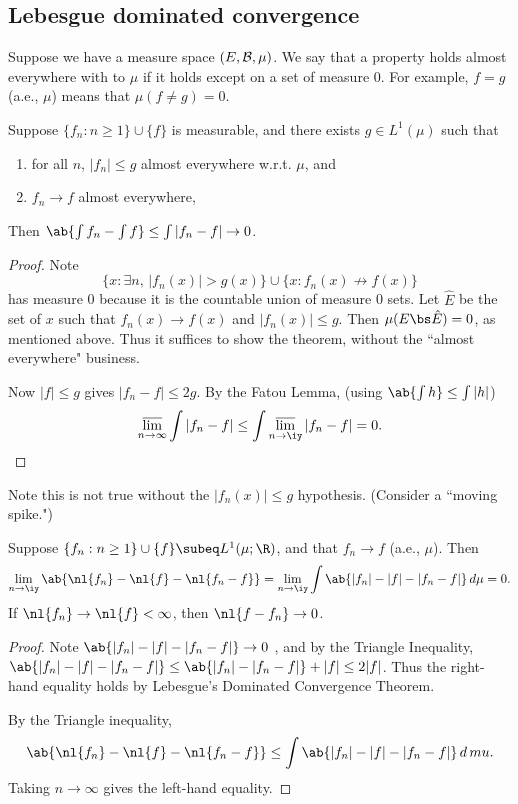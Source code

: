 
\subsection{Lebesgue dominated convergence}
Suppose we have a measure space $(E,\cal B, \mu)$. We say that a property holds almost everywhere with to $\mu$ if it holds except on a set of measure 0. %
For example, $f=g$ (a.e., $\mu$) means that $\mu(f\neq g)=0$.

\begin{thm}
Suppose $\{f_n:n\ge 1\}\cup \{f\}$ is measurable, and there exists $g\in L^1(\mu)$ such that 
\begin{enumerate}
\item
for all $n$, $|f_n|\le g$ almost everywhere w.r.t. $\mu$, and %
\item
$f_n\to f$ almost everywhere,
\end{enumerate}
Then $\ab{\int f_n-\int f}\le \int |f_n-f|\to 0$.
\end{thm}
\begin{proof}
Note
\[
\{x:\exists n,\, |f_n(x)|>g(x)\}\cup \{x:f_n(x)\not\to f(x)\}
\]
has measure 0 because it is the countable union of measure 0 sets.
Let $\hat E$ be the set of $x$ such that $f_n(x)\to f(x)$ and $|f_n(x)|\le g$. Then $\mu(E\bs \hat E)=0$, as mentioned above.
Thus it suffices to show the theorem, without the ``almost everywhere" business.

Now $|f|\le g$ gives $|f_n-f|\le 2g$. By the Fatou Lemma, (using $\ab{\int h}\leq \int | h|$)
\[
\varlimsup_{n\to \infty} \int |f_n-f|\le \int \varlimsup_{n\to \iy} |f_n-f|=0.
\]
\end{proof}
Note this is not true without the $|f_n(x)|\le g$ hypothesis. (Consider a ``moving spike.")

\begin{thm}\label{lieb}
Suppose $\{f_n:n\ge 1\}\cup \{f\}\subeq L^1(\mu;\R)$, and that $f_n\to f$ (a.e., $\mu$). Then
\[
\lim_{n\to \iy} \ab{
\nl{f_n}-\nl{f}-\nl{f_n-f}
}
=
\lim_{n\to \iy}\int \ab{
|f_n|-|f|-|f_n-f|
}\,d\mu=0.
\]
If $\nl{f_n}\to \nl{f}<\infty$, then $\nl{f-f_n}\to 0$.
\end{thm}
\begin{proof}
Note $\ab{|f_n|-|f|-|f_n-f|}\to 0$ \am{}, and by the Triangle Inequality,
$\ab{|f_n|-|f|-|f_n-f|}\leq \ab{|f_n|-|f_n-f|}+|f|\le 2|f|$. Thus the right-hand equality holds by Lebesgue's Dominated Convergence Theorem.

By the Triangle inequality,
\[
\ab{
\nl{f_n}-\nl{f}-\nl{f_n-f}
}
\leq 
\int \ab{
|f_n|-|f|-|f_n-f|
}\,d\,mu.
\]
Taking $n\to \infty$ gives the left-hand equality.
\end{proof}
